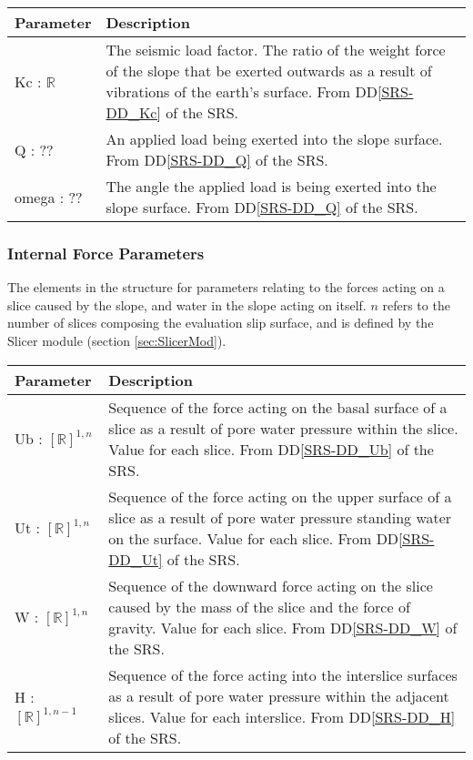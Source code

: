 \documentclass[12pt]{article}
\begin{document}
\begin{center}
\begin{longtable}{ p{}
    p{}}\hline 

  \textbf{Parameter} & \textbf{Description}\\ \hline

  Kc : $\mathbb{R}$ & The seismic load factor. The ratio of the weight
  force of the slope that be exerted outwards as a result of
  vibrations of the earth's surface. From DD\ref{SRS-DD_Kc} of the
  SRS.\\

  Q : ?? & An applied load being exerted into the slope surface. From
  DD\ref{SRS-DD_Q} of the SRS. \\

  omega : ?? & The angle the applied load is being exerted into the slope
  surface. From DD\ref{SRS-DD_Q} of the SRS.\\ \hline
\end{longtable}
\end{center}

\subsubsection{Internal Force Parameters} \label{Tbl:ForceParam}
\noindent
The elements in the structure for parameters relating to the forces
acting on a slice caused by the slope, and water in the slope acting
on itself. $n$ refers to the number of slices composing the evaluation
slip surface, and is defined by the Slicer module (section
\ref{sec:SlicerMod}).

\begin{center}
\begin{longtable}{ p{} 
    p{}}\hline 

  \textbf{Parameter} & \textbf{Description}\\ \hline

  Ub : $[\mathbb{R}]^{1,n}$ & Sequence of the force acting on the
  basal surface of a slice as a result of pore water pressure within
  the slice. Value for each slice. From DD\ref{SRS-DD_Ub} of the
  SRS.\\
  
  Ut : $[\mathbb{R}]^{1,n}$ & Sequence of the force acting on the
  upper surface of a slice as a result of pore water pressure standing
  water on the surface. Value for each slice. From DD\ref{SRS-DD_Ut}
  of the SRS.\\

  W : $[\mathbb{R}]^{1,n}$ & Sequence of the downward force acting on
  the slice caused by the mass of the slice and the force of
  gravity. Value for each slice. From DD\ref{SRS-DD_W} of the SRS.\\

  H : $[\mathbb{R}]^{1,n-1}$ & Sequence of the force acting into the
  interslice surfaces as a result of pore water pressure within the
  adjacent slices. Value for each interslice. From DD\ref{SRS-DD_H} of
  the SRS.\\
\end{longtable}
\end{center}
\end{document}
